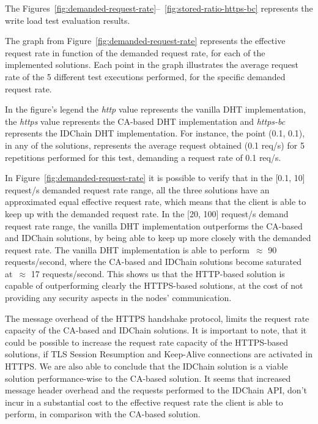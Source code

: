 The Figures~\ref{fig:demanded-request-rate}–~\ref{fig:stored-ratio-https-bc} represents the write load test evaluation results.

The graph from Figure~\ref{fig:demanded-request-rate} represents the effective request rate in function of the demanded request rate, for each of the implemented solutions.
Each point in the graph illustrates the average request rate of the 5 different test executions performed, for the specific demanded request rate.

In the figure's legend the \textit{http} value represents the vanilla DHT implementation, the \textit{https} value represents the CA-based DHT implementation and \textit{https-bc} represents the IDChain DHT implementation.
For instance, the point (0.1, 0.1), in any of the solutions, represents the average request obtained (0.1 req/s) for 5 repetitions performed for this test, demanding a request rate of 0.1 req/s.

In Figure~\ref{fig:demanded-request-rate} it is possible to verify that in the [0.1, 10] request/s demanded request rate range, all the three solutions have an approximated equal effective request rate, which means that the client is able to keep up with the demanded request rate.
In the [20, 100] request/s demand request rate range, the vanilla DHT implementation outperforms the CA-based and IDChain solutions, by being able to keep up more closely with the demanded request rate.
The vanilla DHT implementation is able to perform~$\approx$ 90 requests/second, where the CA-based and IDChain solutions become saturated at~$\approx$ 17 requests/second.
This shows us that the HTTP-based solution is capable of outperforming clearly the HTTPS-based solutions, at the cost of not providing any security aspects in the nodes' communication.

The message overhead of the HTTPS handshake protocol, limits the request rate capacity of the CA-based and IDChain solutions.
It is important to note, that it could be possible to increase the request rate capacity of the HTTPS-based solutions, if TLS Session Resumption and Keep-Alive connections are activated in HTTPS.
We are also able to conclude that the IDChain solution is a viable solution performance-wise to the CA-based solution.
It seems that increased message header overhead and the requests performed to the IDChain API, don't incur in a substantial cost to the effective request rate the client is able to perform, in comparison with the CA-based solution.

